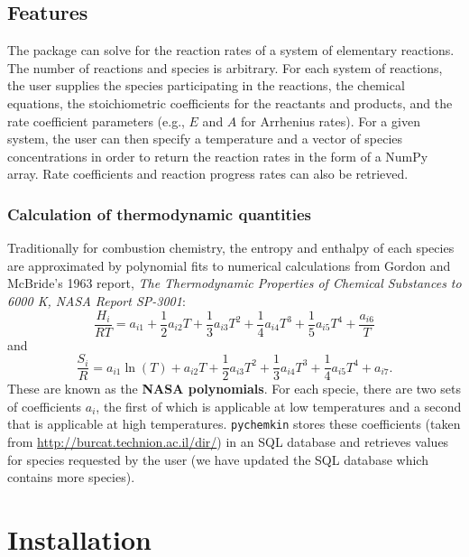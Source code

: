 \documentclass[12pt]{article}
\begin{document}
\subsection{Features}
The package can solve for the reaction rates of a system of elementary reactions. The number of reactions and species is arbitrary. For each system of reactions, the user supplies the species participating in the reactions, the chemical equations, the stoichiometric coefficients for the reactants and products, and the rate coefficient parameters (e.g., $E$ and $A$ for Arrhenius rates). For a given system, the user can then specify a temperature and a vector of species concentrations in order to return the reaction rates in the form of a NumPy array. Rate coefficients and reaction progress rates can also be retrieved. 

\subsubsection{Calculation of thermodynamic quantities}
Traditionally for combustion chemistry, the entropy and enthalpy of each species are approximated by polynomial fits to numerical calculations from Gordon and McBride's 1963 report, \textit{The Thermodynamic Properties of Chemical Substances to 6000 K, NASA Report SP-3001}:
\begin{equation}
\frac{H_{i}}{RT} = a_{i1} + \frac{1}{2}a_{i2}T + \frac{1}{3}a_{i3}T^{2} + \frac{1}{4}a_{i4}T^{3} + \frac{1}{5}a_{i5}T^{4} + \frac{a_{i6}}{T}
\end{equation}
and 
\begin{equation}
\frac{S_{i}}{R} = a_{i1}\ln\left(T\right) + a_{i2}T + \frac{1}{2}a_{i3}T^{2} + \frac{1}{3}a_{i4}T^{3} + \frac{1}{4}a_{i5}T^{4} + a_{i7}.
\end{equation}
These are known as the \textbf{NASA polynomials}. For each specie, there are two sets of coefficients $a_i$, the first of which is applicable at low temperatures and a second that is applicable at high temperatures. \texttt{pychemkin} stores these coefficients (taken from \url{http://burcat.technion.ac.il/dir/}) in an SQL database and retrieves values for species requested by the user (we have updated the SQL database which contains more species). 




\section{Installation}
\end{document}
